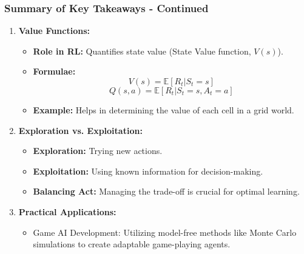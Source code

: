 \documentclass[aspectratio=169]{beamer}
\begin{document}
\begin{frame}[fragile]
    \frametitle{Summary of Key Takeaways - Continued}
    \begin{enumerate}[resume]
        \item \textbf{Value Functions:}
            \begin{itemize}
                \item \textbf{Role in RL:} Quantifies state value (State Value function, $V(s)$).
                \item \textbf{Formulae:}
                    \begin{equation}
                        V(s) = \mathbb{E} \left[ R_t | S_t = s \right]
                    \end{equation}
                    \begin{equation}
                        Q(s, a) = \mathbb{E} \left[ R_t | S_t = s, A_t = a \right]
                    \end{equation}
                \item \textbf{Example:} Helps in determining the value of each cell in a grid world.
            \end{itemize}

        \item \textbf{Exploration vs. Exploitation:}
            \begin{itemize}
                \item \textbf{Exploration:} Trying new actions.
                \item \textbf{Exploitation:} Using known information for decision-making.
                \item \textbf{Balancing Act:} Managing the trade-off is crucial for optimal learning.
            \end{itemize}

        \item \textbf{Practical Applications:}
            \begin{itemize}
                \item Game AI Development: Utilizing model-free methods like Monte Carlo simulations to create adaptable game-playing agents.
            \end{itemize}
    \end{enumerate}
\end{frame}
\end{document}
